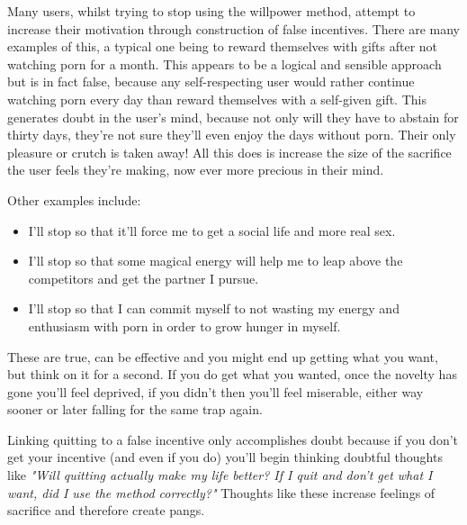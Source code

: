 \documentclass[easypeasy.tex]{subfiles}
\begin{document}
Many users, whilst trying to stop using the willpower method, attempt to increase their motivation through construction of false incentives. There are many examples of this, a typical one being to reward themselves with gifts after not watching porn for a month. This appears to be a logical and sensible approach but is in fact false, because any self-respecting user would rather continue watching porn every day than reward themselves with a self-given gift. This generates doubt in the user's mind, because not only will they have to abstain for thirty days, they're not sure they'll even enjoy the days without porn. Their only pleasure or crutch is taken away! All this does is increase the size of the sacrifice the user feels they're making, now ever more precious in their mind.

Other examples include:
\begin{itemize}
  \item I'll stop so that it'll force me to get a social life and more real sex.
  \item I'll stop so that some magical energy will help me to leap above the competitors and get the partner I pursue.
  \item I'll stop so that I can commit myself to not wasting my energy and enthusiasm with porn in order to grow hunger in myself.
\end{itemize}

These are true, can be effective and you might end up getting what you want, but think on it for a second. If you do get what you wanted, once the novelty has gone you'll feel deprived, if you didn't then you'll feel miserable, either way sooner or later falling for the same trap again.

Linking quitting to a false incentive only accomplishes doubt because if you don't get your incentive (and even if you do) you'll begin thinking doubtful thoughts like \textit{"Will quitting actually make my life better? If I quit and don't get what I want, did I use the method correctly?"} Thoughts like these increase feelings of sacrifice and therefore create pangs.
\end{document}

